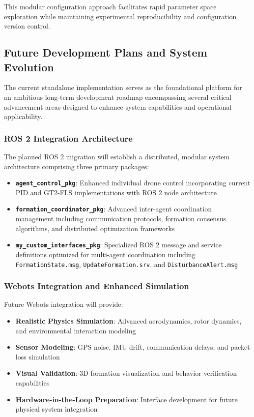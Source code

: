 This modular configuration approach facilitates rapid parameter space exploration while maintaining experimental reproducibility and configuration version control.

\subsection*{Future Development Plans and System Evolution}

The current standalone implementation serves as the foundational platform for an ambitious long-term development roadmap encompassing several critical advancement areas designed to enhance system capabilities and operational applicability.

\subsubsection*{ROS 2 Integration Architecture}

The planned ROS 2 migration will establish a distributed, modular system architecture comprising three primary packages:

\begin{itemize}
    \item \textbf{\texttt{agent\_control\_pkg}}: Enhanced individual drone control incorporating current PID and GT2-FLS implementations with ROS 2 node architecture
    \item \textbf{\texttt{formation\_coordinator\_pkg}}: Advanced inter-agent coordination management including communication protocols, formation consensus algorithms, and distributed optimization frameworks
    \item \textbf{\texttt{my\_custom\_interfaces\_pkg}}: Specialized ROS 2 message and service definitions optimized for multi-agent coordination including \texttt{FormationState.msg}, \texttt{UpdateFormation.srv}, and \texttt{DisturbanceAlert.msg}
\end{itemize}

\subsubsection*{Webots Integration and Enhanced Simulation}

Future Webots integration will provide:
\begin{itemize}
    \item \textbf{Realistic Physics Simulation}: Advanced aerodynamics, rotor dynamics, and environmental interaction modeling
    \item \textbf{Sensor Modeling}: GPS noise, IMU drift, communication delays, and packet loss simulation
    \item \textbf{Visual Validation}: 3D formation visualization and behavior verification capabilities
    \item \textbf{Hardware-in-the-Loop Preparation}: Interface development for future physical system integration
\end{itemize}

